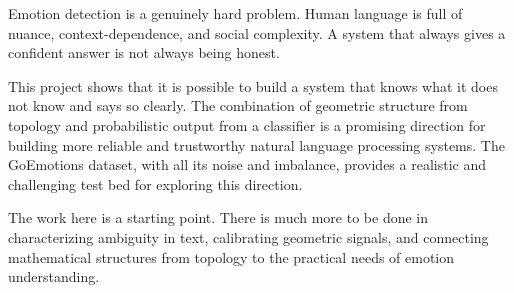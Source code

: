 Emotion detection is a genuinely hard problem. Human language is full of nuance,
context-dependence, and social complexity. A system that always gives a confident answer is
not always being honest.

This project shows that it is possible to build a system that knows what it does not know and
says so clearly. The combination of geometric structure from topology and probabilistic output
from a classifier is a promising direction for building more reliable and trustworthy natural
language processing systems. The GoEmotions dataset, with all its noise and imbalance,
provides a realistic and challenging test bed for exploring this direction.

The work here is a starting point. There is much more to be done in characterizing ambiguity in
text, calibrating geometric signals, and connecting mathematical structures from topology to the
practical needs of emotion understanding.
